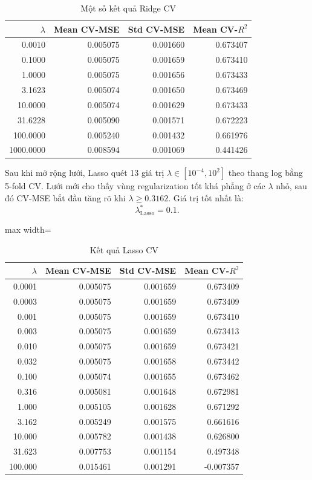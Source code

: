 \begin{table}[H]
\centering
\caption{Một số kết quả Ridge CV}
\label{tab:part2_ridge_cv}
\begin{tabular}{@{}rrrr@{}}
\hline
\textbf{$\lambda$} & \textbf{Mean CV-MSE} & \textbf{Std CV-MSE} & \textbf{Mean CV-$R^2$} \\
\hline
0.0010 & 0.005075 & 0.001660 & 0.673407 \\
0.1000 & 0.005075 & 0.001659 & 0.673410 \\
1.0000 & 0.005075 & 0.001656 & 0.673433 \\
3.1623 & 0.005074 & 0.001650 & 0.673469 \\
10.0000 & 0.005074 & 0.001629 & 0.673433 \\
31.6228 & 0.005090 & 0.001571 & 0.672223 \\
100.0000 & 0.005240 & 0.001432 & 0.661976 \\
1000.0000 & 0.008594 & 0.001069 & 0.441426 \\
\hline
\end{tabular}
\end{table}

Sau khi mở rộng lưới, Lasso quét 13 giá trị
$\lambda \in [10^{-4}, 10^2]$ theo thang log bằng 5-fold CV. Lưới mới cho thấy vùng
regularization tốt khá phẳng ở các $\lambda$ nhỏ, sau đó CV-MSE bắt đầu tăng rõ khi
$\lambda \ge 0.3162$. Giá trị tốt nhất là:
\begin{equation}
    \lambda^*_{\mathrm{Lasso}} = 0.1.
\end{equation}

\begin{table}[H]
\centering
\caption{Kết quả Lasso CV}
\label{tab:part2_lasso_cv}
\small
\renewcommand{\arraystretch}{1.0}
\begin{adjustbox}{max width=\textwidth}
\begin{tabular}{@{}rrrr@{}}
\hline
\textbf{$\lambda$} & \textbf{Mean CV-MSE} & \textbf{Std CV-MSE} & \textbf{Mean CV-$R^2$} \\
\hline
0.0001 & 0.005075 & 0.001659 & 0.673409 \\
0.0003 & 0.005075 & 0.001659 & 0.673409 \\
0.001 & 0.005075 & 0.001659 & 0.673410 \\
0.003 & 0.005075 & 0.001659 & 0.673413 \\
0.010 & 0.005075 & 0.001659 & 0.673421 \\
0.032 & 0.005075 & 0.001658 & 0.673442 \\
0.100 & 0.005074 & 0.001655 & 0.673462 \\
0.316 & 0.005081 & 0.001648 & 0.672981 \\
1.000 & 0.005105 & 0.001628 & 0.671292 \\
3.162 & 0.005249 & 0.001575 & 0.661616 \\
10.000 & 0.005782 & 0.001438 & 0.626800 \\
31.623 & 0.007753 & 0.001154 & 0.497348 \\
100.000 & 0.015461 & 0.001291 & -0.007357 \\
\hline
\end{tabular}
\end{adjustbox}
\end{table}

